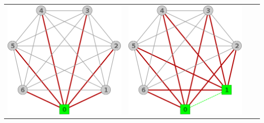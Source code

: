 \begin{center}
\begin{tabular}{ |c||c||c||c| }
			\includegraphics[scale = 0.25]{img/ej3/constructiva_golosa/K7_st1.png} &
			\includegraphics[scale = 0.25]{img/ej3/constructiva_golosa/K7_st2.png} &

\end{tabular}
\end{center}
